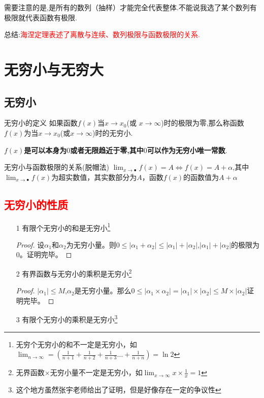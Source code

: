\documentclass[12pt, a4paper, oneside, UTF8]{ctexbook}
\begin{document}
\begin{sloppypar}
\begin{center}
    \end{center}
    需要注意的是,是所有的数列（抽样）才能完全代表整体.不能说我选了某个数列有极限就代表函数有极限.

    总结:\textcolor{red}{海涅定理表述了离散与连续、数列极限与函数极限的关系.}
    \section{无穷小与无穷大}
    \subsection{无穷小}
    \begin{defn}{无穷小的定义}{}
        如果函数$f(x)$当$x\to x_0$(或 $x\to\infty$)时的极限为零,那么称函数$f(x)$为当$x\to x_0$(或$x\to\infty$)时的无穷小.
    \end{defn}
    \textbf{$f(x)$是可以本身为$0$或者无限趋近于零,其中$0$可以作为无穷小唯一常数}.
    \begin{criterion}{无穷小与函数极限的关系(脱帽法)}{}
        $\lim_{x\to\bullet}f(x)=A\Leftrightarrow f(x)=A+\alpha$,其中$\lim_{x\to\bullet}f(x)$为超实数值，其实数部分为$A$，函数$f(x)$的函数值为$A+\alpha$
    \end{criterion}
    \subsection{\textcolor{red}{无穷小的性质}}
    \begin{itemize}
        \item[1] 有限个无穷小的和是无穷小\footnote{无穷个无穷小的和不一定是无穷小，如$\lim_{n \to \infty}=(\frac{1}{n+1}+\frac{1}{n+2}+\frac{1}{n+3}\dots +\frac{1}{n+n})=\ln 2$}
            \begin{proof}
                设$\alpha_1$和$\alpha_2$为无穷小量。则$0 \leqslant |\alpha_1+\alpha_2|\leqslant |\alpha_1|+|\alpha_2|$,$|\alpha_1|+|\alpha_2|$的极限为0。证明完毕。
            \end{proof}
        \item[2] 有界函数与无穷小的乘积是无穷小\footnote{无界函数$\times$无穷小量不一定是无穷小，如$\lim_{x \to \infty}x \times \frac{1}{x}=1$}
            \begin{proof}
                $|\alpha _1|\leqslant M$,$\alpha_2$是无穷小量。那么$0\leqslant|\alpha_1 \times \alpha_2|=|\alpha_1|\times |\alpha_2|\leqslant M \times |\alpha_2|$证明完毕。
            \end{proof}
        \item[3] 有限个无穷小的乘积是无穷小\footnote{这个地方虽然张宇老师给出了证明，但是好像存在一定的争议性}
    \end{itemize}

\end{sloppypar}
\end{document}
